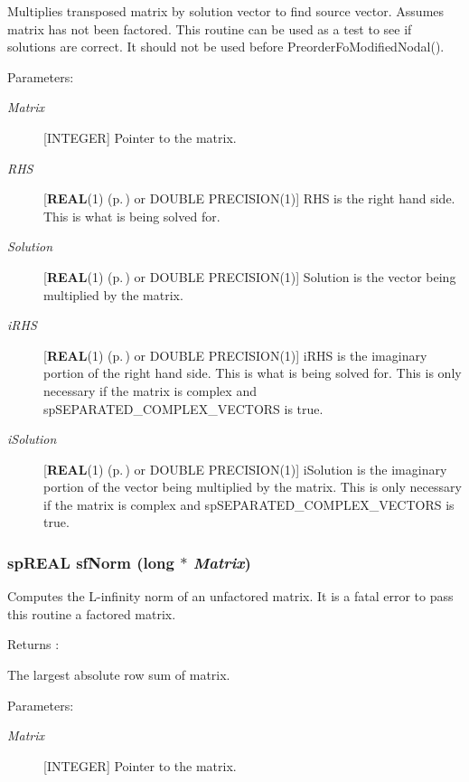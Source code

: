 Multiplies transposed matrix by solution vector to find source vector. Assumes matrix has not been factored. This routine can be used as a test to see if solutions are correct. It should not be used before Preorder\-Fo\-Modified\-Nodal().\begin{Desc}
\item[Parameters: ]\par
\begin{description}
\item[{\em 
Matrix}][INTEGER] Pointer to the matrix. \item[{\em 
RHS}][{\bf REAL}(1) {\rm (p.\,\pageref{spConfig_8h_a0})} or DOUBLE PRECISION(1)] RHS is the right hand side. This is what is being solved for. \item[{\em 
Solution}][{\bf REAL}(1) {\rm (p.\,\pageref{spConfig_8h_a0})} or DOUBLE PRECISION(1)] Solution is the vector being multiplied by the matrix. \item[{\em 
i\-RHS}][{\bf REAL}(1) {\rm (p.\,\pageref{spConfig_8h_a0})} or DOUBLE PRECISION(1)] i\-RHS is the imaginary portion of the right hand side. This is what is being solved for. This is only necessary if the matrix is complex and sp\-SEPARATED\_\-COMPLEX\_\-VECTORS is true. \item[{\em 
i\-Solution}][{\bf REAL}(1) {\rm (p.\,\pageref{spConfig_8h_a0})} or DOUBLE PRECISION(1)] i\-Solution is the imaginary portion of the vector being multiplied by the matrix. This is only necessary if the matrix is complex and sp\-SEPARATED\_\-COMPLEX\_\-VECTORS is true. \end{description}
\end{Desc}
\subsubsection{\setlength{\rightskip}{0pt plus 5cm}sp\-REAL sf\-Norm (long $\ast$ {\em Matrix})}\label{spFortran_8c_a86}


Computes the L-infinity norm of an unfactored matrix. It is a fatal error to pass this routine a factored matrix.

\begin{Desc}
\item[Returns :]\par
[REAL or DOUBLE PRECISION] The largest absolute row sum of matrix.\end{Desc}
\begin{Desc}
\item[Parameters: ]\par
\begin{description}
\item[{\em 
Matrix}][INTEGER] Pointer to the matrix. \end{description}
\end{Desc}
